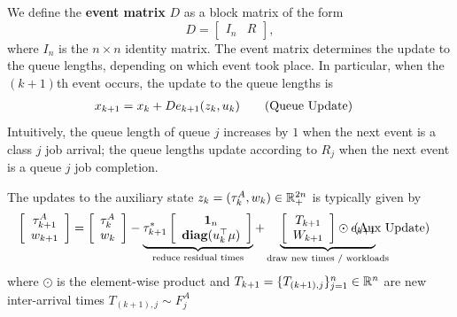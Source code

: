 We define the {\bf event matrix} $D$ as a  block matrix of the form
\[
D=[\begin{array}{cc}
I_{n} & R\end{array}],
\]
where $I_n$ is the $n\times n$ identity matrix. The event matrix determines the update to the queue lengths, depending on which event took place. In particular, when the $(k+1)$th event occurs, the update to the queue lengths is
\begin{align}
x_{k+1} &=x_{k}+D e_{k+1}(z_{k}, u_{k})
\tag{Queue Update} 
\end{align}
Intuitively, the queue length of queue $j$ increases by $1$ when the next event is a class $j$ job arrival; the queue lengths update according to $R_{j}$ when the next event is a queue $j$ job completion.

The updates to the auxiliary state $z_{k} = (\tau_{k}^{A}, w_{k}) \in \mathbb{R}_{+}^{2n}$ is typically given by
\begin{align}\label{eq:aux_update}
\left[
\begin{array}{c}
\tau_{k+1}^{A} \\
w_{k+1}
\end{array}
\right]
&= 
\left[
\begin{array}{c}
\tau_{k}^{A} \\
w_{k}
\end{array}
\right]
- 
\underbrace{\tau_{k+1}^{*}\left[
\begin{array}{c}
\ones_{n} \\
\servicemapk
\end{array}
\right]
}_{\text{reduce residual times}} + 
\underbrace{
\left[
\begin{array}{c}
T_{k+1} \\
W_{k+1}
\end{array}
\right] \odot e_{k+1}
}_{\text{draw new times / workloads}}
\hspace{-5em}
\tag{Aux Update} 
\end{align}
where $\odot$ is the element-wise product and
$T_{k+1} =\{T_{(k+1),j}\}_{j=1}^{n} \in \mathbb{R}^{n}$ are new inter-arrival times $T_{(k+1),j}  \sim F_{j}^{A}$ %
